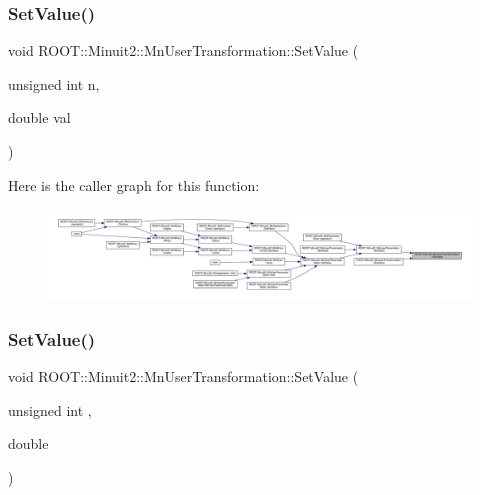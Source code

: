 \subsubsection{\texorpdfstring{SetValue()}{SetValue()}\hspace{0.1cm}{\footnotesize\ttfamily [2/6]}}
{\footnotesize\ttfamily void R\+O\+O\+T\+::\+Minuit2\+::\+Mn\+User\+Transformation\+::\+Set\+Value (\begin{DoxyParamCaption}\item[{unsigned int}]{n,  }\item[{double}]{val }\end{DoxyParamCaption})}

Here is the caller graph for this function\+:
\nopagebreak
\begin{figure}[H]
\begin{center}
\leavevmode
\includegraphics[width=350pt]{d9/d98/classROOT_1_1Minuit2_1_1MnUserTransformation_a62f598ff8d0c916c496f495440101d9c_icgraph}
\end{center}
\end{figure}
\mbox{\label{classROOT_1_1Minuit2_1_1MnUserTransformation_a62f598ff8d0c916c496f495440101d9c}} 
\subsubsection{\texorpdfstring{SetValue()}{SetValue()}\hspace{0.1cm}{\footnotesize\ttfamily [3/6]}}
{\footnotesize\ttfamily void R\+O\+O\+T\+::\+Minuit2\+::\+Mn\+User\+Transformation\+::\+Set\+Value (\begin{DoxyParamCaption}\item[{unsigned int}]{,  }\item[{double}]{ }\end{DoxyParamCaption})}

\mbox{\label{classROOT_1_1Minuit2_1_1MnUserTransformation_a30717c0bcc5206cc957e505b9cfd64fd}} 
